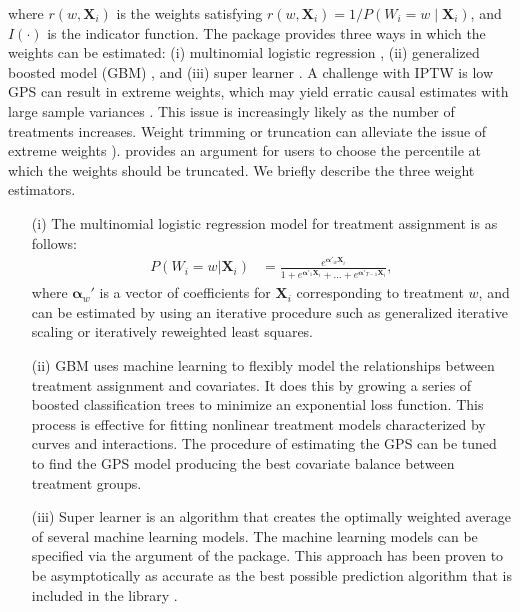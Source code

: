 where $r(w,\bm{X}_i)$ is the weights satisfying $r(w, \bm{X}_i) = 1 /P(W_i = w \mid \bm{X}_i )$, and $I(\cdot)$ is the indicator function. The  package provides three ways in which the weights can be estimated: (i) multinomial logistic regression \citep{feng2012generalized}, (ii) generalized boosted model (GBM) \citep{mccaffrey2013tutorial}, and (iii) super learner \citep{van2007super}. A challenge with IPTW is low GPS can result in extreme weights, which may yield erratic causal estimates with large sample variances \citep{little1988missing, kang2007demystifying}. This issue is increasingly likely as the number of treatments increases. Weight trimming or truncation can alleviate the issue of extreme weights \citep{cole2008constructing, lee2011weight}).  provides an argument for users to choose the percentile at which the weights should be truncated. We briefly describe the three weight estimators. 
\begin{enumerate}
    \item [(i)] The multinomial logistic regression model for treatment assignment is as follows:
\begin{align*}
P(W_i=w|\bm{X}_i) & =\frac{e^{\bm{\alpha'}_w\bm{X}_i}}{1+e^{\bm{\alpha'}_1\bm{X}_{i}} + \ldots +  e^{\bm{\alpha'}_{T-1}\bm{X}_{i}}}, 
\end{align*}
where $\bm{\alpha}_w'$ is a vector of coefficients for $\bm{X}_i$ corresponding to treatment $w$, and can be estimated by using an iterative procedure such as generalized iterative scaling or iteratively reweighted least squares. 
\item[(ii)] GBM uses machine learning to flexibly model the relationships between treatment assignment and covariates. It does this by growing a series of boosted classification trees to minimize an exponential loss function. This process is  effective for fitting nonlinear treatment models characterized by curves
and interactions. The procedure of estimating the GPS can be tuned to find the GPS model producing the best covariate balance between treatment groups. 
\item[(iii)] Super learner is an algorithm that creates the optimally weighted average of several machine learning models.  The machine learning models can be specified via the  argument of the  package. 
This approach has been proven to be asymptotically as accurate as the best possible prediction algorithm that is included in the library \citep{van2007super}. 
\end{enumerate}

